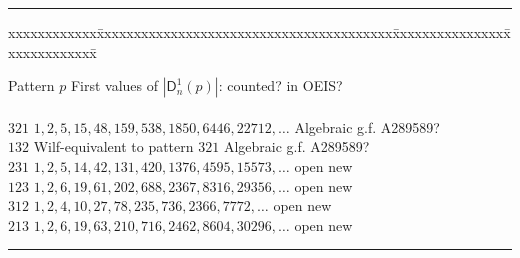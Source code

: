 \documentclass[12pt]{amsart} %
\numberwithin{equation}{section}
\theoremstyle{plain}
\theoremstyle{definition}
\newcommand\D{\mathsf{D}}
\begin{document}
\begin{table}
\hrule

{\small
\begin{tabbing}
xxxxxxxxxxxx\=xxxxxxxxxxxxxxxxxxxxxxxxxxxxxxxxxxxxxxxx\= xxxxxxxxxxxxxxx\=xxxxxxxxxxxxx\= \kill

Pattern $p$\> First values of $|\D_n^1(p)|$: \> counted?\> in OEIS?\\
\\
$321$\> $ 1, 2, 5, 15, 48, 159, 538, 1850, 6446,22712,\ldots$ \> Algebraic g.f.   \> A289589?   \\
$132$\> Wilf-equivalent to pattern $321$ \> Algebraic g.f.  \> A289589?   \\
$231$\> $1,2,5,14,42,131,420,1376,4595,15573,\ldots$ \> open  \> new   \\
$123$\> $1, 2, 6, 19, 61, 202, 688, 2367,8316,29356,\ldots$\> open  \> new   \\
$312$\> $1, 2, 4, 10, 27, 78, 235, 736,2366,7772,\ldots$\> open  \> new    \\
$213$\>  $1, 2, 6, 19, 63, 210, 716, 2462,8604,30296,\ldots$ \> open  \> new 
\vspace{.1in}
\end{tabbing}
}

\hrule
\vspace{.2in}

\caption{Length-$3$ patterns  for $1$-arrangements in derangement form}
\label{3-derange}
\end{table}

\end{document}
